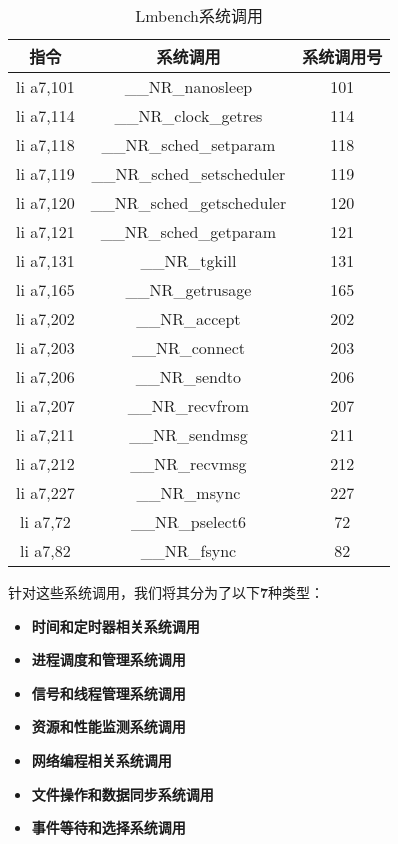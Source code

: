 \begin{table}[h]
\centering
\begin{tabular}{|c|c|c|}
\hline
\textbf{指令} & \textbf{系统调用} & \textbf{系统调用号} \\
\hline
li a7,101 & \_\_NR\_nanosleep & 101 \\
\hline
li a7,114 & \_\_NR\_clock\_getres & 114 \\
\hline
li a7,118 & \_\_NR\_sched\_setparam & 118 \\
\hline
li a7,119 & \_\_NR\_sched\_setscheduler & 119 \\
\hline
li a7,120 & \_\_NR\_sched\_getscheduler & 120 \\
\hline
li a7,121 & \_\_NR\_sched\_getparam & 121 \\
\hline
li a7,131 & \_\_NR\_tgkill & 131 \\
\hline
li a7,165 & \_\_NR\_getrusage & 165 \\
\hline
li a7,202 & \_\_NR\_accept & 202 \\
\hline
li a7,203 & \_\_NR\_connect & 203 \\
\hline
li a7,206 & \_\_NR\_sendto & 206 \\
\hline
li a7,207 & \_\_NR\_recvfrom & 207 \\
\hline
li a7,211 & \_\_NR\_sendmsg & 211 \\
\hline
li a7,212 & \_\_NR\_recvmsg & 212 \\
\hline
li a7,227 & \_\_NR\_msync & 227 \\
\hline
li a7,72 & \_\_NR\_pselect6 & 72 \\
\hline
li a7,82 & \_\_NR\_fsync & 82 \\
\hline
\end{tabular}
\caption{Lmbench系统调用}
\end{table}

针对这些系统调用，我们将其分为了以下\textbf{7}种类型：

\begin{itemize}
    \item \textbf{时间和定时器相关系统调用}

    \item \textbf{进程调度和管理系统调用}

    \item \textbf{信号和线程管理系统调用}

    \item \textbf{资源和性能监测系统调用}

    \item \textbf{网络编程相关系统调用}

    \item \textbf{文件操作和数据同步系统调用}

    \item \textbf{事件等待和选择系统调用}
\end{itemize}

